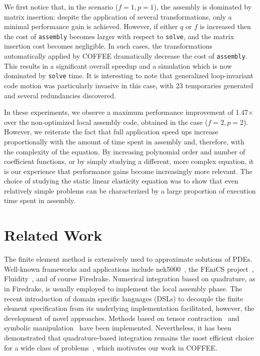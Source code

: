 We first notice that, in the scenario ($f=1, p=1$), the assembly is dominated by matrix insertion: despite the application of several transformations, only a minimal performance gain is achieved. However, if either $q$ or $f$ is increased then the cost of \texttt{assembly} becomes larger with respect to \texttt{solve}, and the matrix insertion cost becomes negligible. In such cases, the transformations automatically applied by COFFEE dramatically decrease the cost of \texttt{assembly}. This results in
a significant overall speedup and a simulation which is now dominated by \texttt{solve} time. It is interesting to note that generalized loop-invariant code motion was particularly invasive in this case, with 23 temporaries generated and several redundancies discovered.

In these experiments, we observe a maximum performance improvement of 1.47$\times$ over the non-optimized local assembly code, obtained in the case ($f=2, p=2$). However, we reiterate the fact that full application speed ups increase proportionally with the amount of time spent in assembly and, therefore, with the complexity of the equation. By
increasing polynomial order and number of coefficient functions, or by simply studying a different, more complex equation, it is our experience that performance gains become increasingly more relevant. The choice of studying the static linear elasticity equation was to show that even relatively simple problems can be characterized by a large proportion of execution time spent in assembly. 

\section{Related Work}
\label{sec:coffee-related-work}
The finite element method is extensively used to approximate solutions of PDEs. Well-known frameworks and applications include nek5000~\cite{nek5000-web-page}, the FEniCS project~\cite{Fenics}, Fluidity~\cite{fluidity_manual_v4}, and of course Firedrake. Numerical integration based on quadrature, as in Firedrake, is usually employed to implement the local assembly phase. The recent introduction of domain specific languages (DSLs) to decouple the finite element specification from its underlying implementation facilitated, however, the development of novel approaches. Methods based on tensor contraction~\citep{FFC-Compiler} and symbolic manipulation~\citep{francis} have been implemented. Nevertheless, it has been demonstrated that quadrature-based integration remains the most efficient choice for a wide class of problems~\citep{quadrature-olegaard}, which motivates our work in COFFEE.

